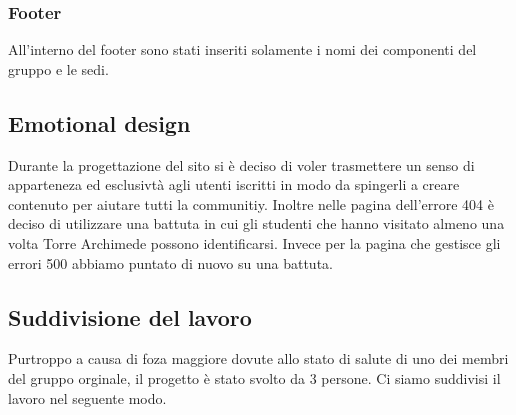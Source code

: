 \subsubsection{Footer}
All'interno del footer sono stati inseriti solamente i nomi dei componenti del gruppo e le sedi.

\subsection{Emotional design}
Durante la progettazione del sito si è deciso di voler trasmettere un senso di apparteneza ed esclusivtà agli utenti iscritti in modo da spingerli a creare contenuto per aiutare tutti la communitiy.
Inoltre nelle pagina dell'errore 404 è deciso di utilizzare una battuta in cui gli studenti che hanno visitato almeno una volta Torre Archimede possono identificarsi. Invece per la pagina che gestisce gli errori 500 abbiamo puntato di nuovo su una battuta.


\subsection{Suddivisione del lavoro}
Purtroppo a causa di foza maggiore dovute allo stato di salute di uno dei membri del gruppo orginale, il progetto è stato svolto da 3 persone. Ci siamo suddivisi il lavoro nel seguente modo.

